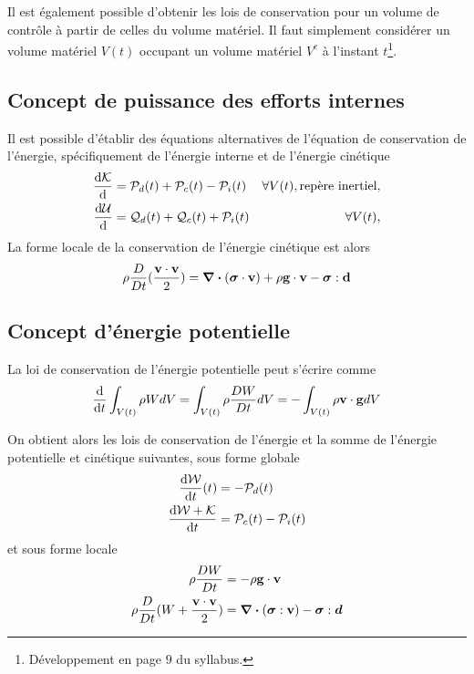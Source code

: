 \documentclass[a4paper,11pt]{report}
\newcommand{\dvm}[2]{\frac{D #1}{D #2}}
\begin{document}
      Il est également possible d'obtenir les lois de conservation pour un volume de contrôle à partir de celles du volume matériel. Il faut simplement considérer un volume matériel $V(t)$ occupant un volume matériel $V^c$ à l'instant $t$\footnote{Développement en page $9$ du syllabus.}.

    \subsection{Concept de puissance des efforts internes}
      Il est possible d'établir des équations alternatives de l'équation de conservation de l'énergie, spécifiquement de l'énergie interne et de l'énergie cinétique
      \begin{gather}\begin{aligned}
        \dv{\mathcal{K}} {}(t) &= \mathcal{P}_d(t) + \mathcal{P}_c(t) - \mathcal{P}_i(t) & \forall V(t), \textrm{repère inertiel},\\
        \dv{\mathcal{U}} {}(t) &= \mathcal{Q}_d(t) + \mathcal{Q}_c(t) + \mathcal{P}_i(t) & \forall V(t),
      \end{aligned}\end{gather}
      La forme locale de la conservation de l'énergie cinétique est alors
      \begin{equation}
        \rho \dvm{}{t}(\frac{\vb{v}\cdot \vb{v}}{2}) = \div (\boldsymbol{\sigma} \cdot \vb{v}) + \rho \vb{g} \cdot \vb{v} - \boldsymbol{\sigma} : \vb{d}
      \end{equation}

      \subsection{Concept d'énergie potentielle}
        La loi de conservation de l'énergie potentielle peut s'écrire comme
        \begin{equation}
          \dv{t}\int_{V(t)} \rho W dV = \int_{V(t)} \rho \dvm{W}{t} dV = - \int_{V(t)} \rho \vb{v} \cdot \vb{g} dV
        \end{equation}

        On obtient alors les lois de conservation de l'énergie et la somme de l'énergie potentielle et cinétique suivantes, sous forme globale
        \begin{gather}\begin{aligned}
            \dv{\mathcal{W}}{t} {}(t) &= -\mathcal{P}_d(t)\\
            \dv{\mathcal{W} + \mathcal{K}}{t} &= \mathcal{P}_c(t) - \mathcal{P}_i(t)
        \end{aligned}\end{gather}
        et sous forme locale
        \begin{align}
          \rho \dvm{W}{t} &= -\rho \vb{g} \cdot \vb{v}\\
          \rho \dvm{}{t}(W + \frac{\vb{v} \cdot\vb{v}}{2}) &= \div (\boldsymbol{\sigma} : \vb{v}) - \boldsymbol{\sigma} : \boldsymbol{d}\nonumber
        \end{align}
\end{document}
